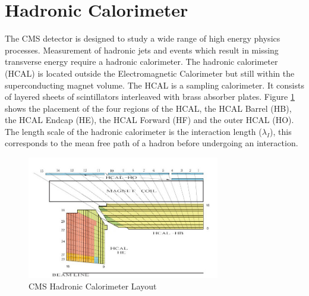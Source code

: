 \section{Hadronic Calorimeter}
The CMS detector is designed to study a wide range of high energy 
physics processes. Measurement of hadronic jets and
events which result in missing transverse energy require
a hadronic calorimeter. 
The hadronic calorimeter (HCAL) is located outside the Electromagnetic 
Calorimeter but still within the
superconducting magnet volume. 
The HCAL is a sampling calorimeter. It consists of layered 
sheets of scintillators interleaved with brass absorber plates. 
Figure \ref{fig:HCALLayout}
shows the placement of the four regions of the HCAL, the HCAL Barrel (HB),
the HCAL Endcap (HE), the HCAL Forward (HF) and the outer HCAL (HO). 
The length scale of the hadronic calorimeter is the interaction length ($\lambda_{I}$),
this corresponds to the mean free path of a hadron before undergoing
an interaction. 
\begin{figure}[hb]
  \centering
	\includegraphics[width=0.75\textwidth]{images/HCAL.jpg}
  	\caption[HCAL Layout]
   	{CMS Hadronic Calorimeter Layout}
	\label{fig:HCALLayout}
\end{figure}

